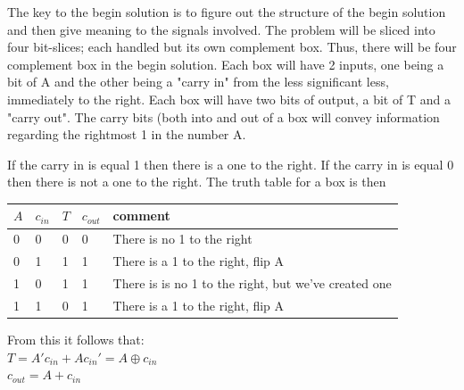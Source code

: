 \begin{enumerate}
\begin{solution}{
	The key to the begin solution  is to figure out the structure
	of the begin solution  and then give meaning to the signals involved.
	The problem will be sliced into four bit-slices; each handled
	but its own complement box.  Thus, there will be four complement
	box in the begin solution.  Each box will have 2 inputs, one being
	a bit of A and the other being a "carry in" from the less
	significant less, immediately to the right.  Each box
	will have two bits of output, a bit of T and a "carry out".
	The carry bits (both into and out of a box will convey
	information regarding the rightmost 1 in the number A.

	If the carry in is equal 1 then there is a one to the right. 
	If the carry in is equal 0 then there is not a one to the right. 
	The truth table for a box is then

	\begin{table}
	\begin{tabular}{l|l||l|l|l}
	$A$ & $c_{in}$  & $T$ & $c_{out}$ & comment \\ \hline
	0   & 0   	&   0 & 0    	  & There is no 1 to the right \\ \hline
	0   & 1   	&   1 & 1    	  & There is a 1 to the right, flip A \\ \hline
	1   & 0   	&   1 & 1    	  & There is is no 1 to the right, but we've created one \\ \hline
	1   & 1   	&   0 & 1    	  & There is a 1 to the right, flip A \\ 
	\end{tabular}
	\end{table}

	From this it follows that: \\
	$T=A'c_{in} + A c_{in}'=A \oplus c_{in}$ \\
	$c_{out} = A + c_{in}$
}\end{solution}


\end{enumerate}

